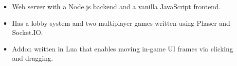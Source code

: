 \documentclass[letterpaper]{resume}
\begin{document}
\begin{minipage}[t]{0.72\columnwidth}
\begin{itemize}
\item Web server with a Node.js backend and a vanilla JavaScript frontend.
\item Has a lobby system and two multiplayer games written using Phaser and Socket.IO.
\end{itemize}

\sectionspace

\begin{itemize}
\item Addon written in Lua that enables moving in-game UI frames via clicking and dragging.
\end{itemize}

\sectionspace

\end{minipage}
\end{document}
